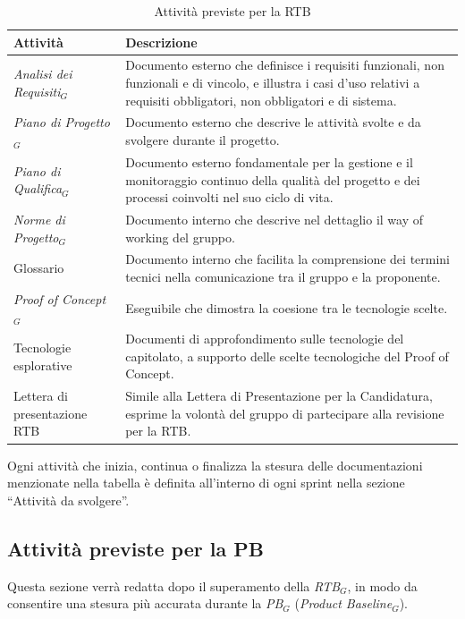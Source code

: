 \documentclass[a4paper, 11pt]{article}
\newcommand{\term}[1]{\textit{#1}$_G$} %
\begin{document}
\begin{table}[H]
\centering
\begin{tabularx}{\textwidth}{|l|X|}
    \hline
    \textbf{Attività} & \textbf{Descrizione} \\ \hline
    \term{Analisi dei Requisiti} & Documento esterno che definisce i requisiti funzionali, non funzionali e di vincolo, e illustra i casi d'uso relativi a requisiti obbligatori, non obbligatori e di sistema. \\ \hline
    \term{Piano di Progetto} & Documento esterno che descrive le attività svolte e da svolgere durante il progetto. \\ \hline
    \term{Piano di Qualifica} & Documento esterno fondamentale per la gestione e il monitoraggio continuo della qualità del progetto e dei processi coinvolti nel suo ciclo di vita. \\ \hline
    \term{Norme di Progetto} & Documento interno che descrive nel dettaglio il way of working del gruppo. \\ \hline
    Glossario & Documento interno che facilita la comprensione dei termini tecnici nella comunicazione tra il gruppo e la proponente. \\ \hline
    \term{Proof of Concept} & Eseguibile che dimostra la coesione tra le tecnologie scelte. \\ \hline
    Tecnologie esplorative & Documenti di approfondimento sulle tecnologie del capitolato, a supporto delle scelte tecnologiche del Proof of Concept. \\ \hline
    Lettera di presentazione RTB & Simile alla Lettera di Presentazione per la Candidatura, esprime la volontà del gruppo di partecipare alla revisione per la RTB. \\ \hline
\end{tabularx}
\caption{Attività previste per la RTB}
\end{table}

Ogni attività che inizia, continua o finalizza la stesura delle documentazioni menzionate nella tabella è definita all'interno di ogni sprint nella sezione ``Attività da svolgere''.

\subsection{Attività previste per la PB}
Questa sezione verrà redatta dopo il superamento della \term{RTB}, in modo da consentire una stesura più accurata durante la \term{PB} (\term{Product Baseline}).
\end{document}
